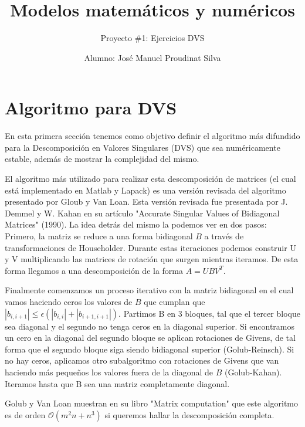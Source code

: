 \documentclass[12pt]{article}
\begin{document}
\title{Modelos matem\'aticos y num\'ericos}
\author{Proyecto \#1: Ejercicios DVS}
\date{Alumno: Jos\'e Manuel Proudinat Silva}
\maketitle


\section{Algoritmo para DVS}

En esta primera sección tenemos como objetivo definir el algoritmo más difundido para la Descomposición en Valores Singulares (DVS) que sea numéricamente estable, además de mostrar la complejidad del mismo.

El algoritmo más utilizado para realizar esta descomposición de matrices (el cual está implementado en Matlab y Lapack) es una versión revisada del algoritmo presentado por Gloub y Van Loan. Esta versión revisada fue presentada por J. Demmel y W. Kahan en su artículo "Accurate Singular Values of Bidiagonal Matrices" (1990). La idea detrás del mismo la podemos ver en dos pasos: Primero, la matriz se reduce a una forma bidiagonal $B$ a través de transformaciones de Householder. Durante estas iteraciones podemos construir U y V multiplicando las matrices de rotación que surgen mientras iteramos. De esta forma llegamos a una descomposición de la forma $A=UBV^T$.

Finalmente comenzamos un proceso iterativo con la matriz bidiagonal en el cual vamos haciendo ceros los valores de $B$ que cumplan que $|b_{i,i+1}|\leq \epsilon(|b_{i,i}|+|b_{i+1,i+1}|).$ Partimos B en 3 bloques, tal que el tercer bloque sea diagonal y el segundo no tenga ceros en la diagonal superior. Si encontramos un cero en la diagonal del segundo bloque se aplican rotaciones de Givens, de tal forma que el segundo bloque siga siendo bidiagonal superior (Golub-Reinsch). Si no hay ceros, aplicamos otro subalgoritmo con rotaciones de Givens que van haciendo más pequeños los valores fuera de la diagonal de $B$ (Golub-Kahan). Iteramos hasta que B sea una matriz completamente diagonal.

Golub y Van Loan muestran en su libro "Matrix computation" que este algoritmo es de orden $\mathcal{O}(m^2n + n^3)$ si queremos hallar la descomposición completa.


\end{document}
